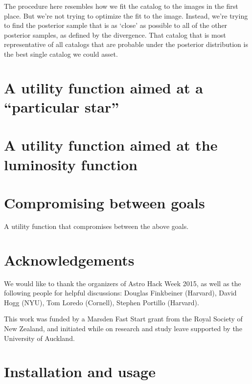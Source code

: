 \documentclass[a4paper,fleqn,usenatbib]{mnras}
\begin{document}
The procedure here resembles how we fit the catalog to the images in the
first place. But we're not trying to optimize the fit to the image. Instead,
we're trying to find the posterior sample that is as `close' as possible to
all of the other posterior samples, as defined by the divergence. That catalog
that is most representative of all catalogs that are probable under the
posterior distribution is the best single catalog we could asset.

\section{A utility function aimed at a ``particular star''}


\section{A utility function aimed at the luminosity function}


\section{Compromising between goals}
A utility function that compromises between the above goals.



\section*{Acknowledgements}
We would like to thank the organizers of Astro Hack Week 2015, as well
as the following people for helpful discussions:
Douglas Finkbeiner (Harvard), David Hogg (NYU), Tom Loredo (Cornell),
Stephen Portillo (Harvard).

This work was funded by a Marsden Fast Start grant from the Royal Society of
New Zealand, and initiated while on research and study leave supported by
the University of Auckland. 









\appendix
\section{Installation and usage}




\bsp	%
\label{lastpage}
\end{document}
